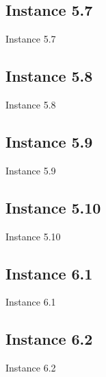 \subsection{Instance 5.7}
\begin{table}[H]
\centering

\caption{Instance 5.7}
\label{tblscp57}
\end{table}
\newpage

\subsection{Instance 5.8}
\begin{table}[H]
\centering

\caption{Instance 5.8}
\label{tblscp58}
\end{table}
\newpage

\subsection{Instance 5.9}
\begin{table}[H]
\centering

\caption{Instance 5.9}
\label{tblscp59}
\end{table}
\newpage

\subsection{Instance 5.10}
\begin{table}[H]
\centering

\caption{Instance 5.10}
\label{tblscp510}
\end{table}
\newpage


\subsection{Instance 6.1}
\begin{table}[H]
\centering

\caption{Instance 6.1}
\label{tblscp61}
\end{table}
\newpage

\subsection{Instance 6.2}
\begin{table}[H]
\centering

\caption{Instance 6.2}
\label{tblscp62}
\end{table}
\newpage

